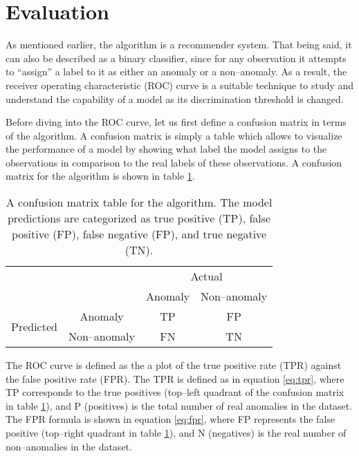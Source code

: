 \section{Evaluation} \label{sect:meth:evaluation}

As mentioned earlier, the \mlblink algorithm is a recommender system. That being said, it can also be described as a binary classifier, since for any observation it attempts to ``assign'' a label to it as either an anomaly or a non--anomaly. As a result, the receiver operating characteristic (ROC) curve is a suitable technique to study and understand the capability of a model as its discrimination threshold is changed. \newline

Before diving into the ROC curve, let us first define a confusion matrix in terms of the \mlblink algorithm. A confusion matrix is simply a table which allows to visualize the performance of a model by showing what label the model assigns to the observations in comparison to the real labels of these observations. A confusion matrix for the \mlblink algorithm is shown in table \ref{table:confusion-matrix}.

\begin{table}[H]
    \centering
    \begin{tabular}{cc|cc}
        \multicolumn{2}{c}{}
        & \multicolumn{2}{c}{Actual} \\
        &       &   Anomaly &   Non--anomaly \\ 
        \cline{2-4}
        \multirow{2}{*}{Predicted}
            & Anomaly         & TP   & FP  \\
            & Non--anomaly    & FN   & TN  \\ 
            \cline{2-4}
    \end{tabular}
    \caption{A confusion matrix table for the \mlblink algorithm. The model predictions are categorized as true positive (TP), false positive (FP), false negative (FP), and true negative (TN).}
    \label{table:confusion-matrix}
\end{table}

The ROC curve is defined as the a plot of the true positive rate (TPR) against the false positive rate (FPR). The TPR is defined as in equation \ref{eq:tpr}, where TP corresponds to the true positives (top--left quadrant of the confusion matrix in table \ref{table:confusion-matrix}), and P (positives) is the total number of real anomalies in the dataset. The FPR formula is shown in equation \ref{eq:fpr}, where FP represents the false positive (top--right quadrant in table \ref{table:confusion-matrix}), and N (negatives) is the real number of non--anomalies in the dataset.

